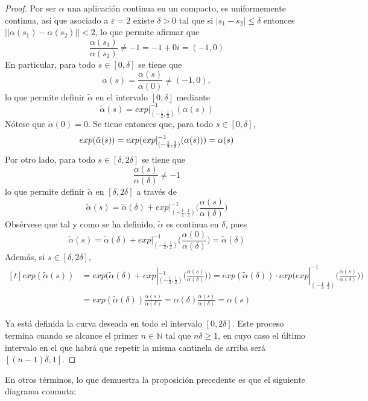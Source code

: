 \documentclass[11pt]{report}
\theoremstyle{definition}
\theoremstyle{definition}
\theoremstyle{remark}
\newcommand{\R}{\mathbb R}
\newcommand{\N}{\mathbb N}
\begin{document}
\begin{proof}
Por ser $\alpha$ una aplicación continua en un compacto, es uniformemente continua, así que asociado a $\varepsilon = 2$ existe $\delta > 0$ tal que si $|s_1-s_2| \leq \delta$ entonces $||\alpha(s_1)-\alpha(s_2)|| < 2$, lo que permite afirmar que
\[\frac{\alpha(s_1)}{\alpha(s_2)} \neq -1 = -1+0i = (-1,0)\]
En particular, para todo $s \in [0,\delta]$ se tiene que
\[\alpha(s) = \frac{\alpha(s)}{\alpha(0)} \neq (-1,0),\]
lo que permite definir $\tilde{\alpha}$ en el intervalo $[0,\delta]$ mediante
\[\tilde{\alpha}(s) = exp|_{(-\frac{1}{2},\frac{1}{2})}^{-1}(\alpha(s))\]
Nótese que $\tilde{\alpha}(0) = 0$. Se tiene entonces que, para todo $s \in [0,\delta]$,
\[exp(\tilde{\alpha}(s)) = exp(exp|_{(-\frac{1}{2},\frac{1}{2})}^{-1}(\alpha(s))) = \alpha(s)\textup{}\]
Por otro lado, para todo $s \in [\delta,2\delta]$ se tiene que
\[\frac{\alpha(s)}{\alpha(\delta)} \neq -1\]
lo que permite definir $\tilde{\alpha}$ en $[\delta,2\delta]$ a través de
\[\tilde{\alpha}(s) = \tilde{\alpha}(\delta)+exp|_{(-\frac{1}{2},\frac{1}{2})}^{-1}\biggl(\frac{\alpha(s)}{\alpha(\delta)}\biggr)\]
Obsérvese que tal y como se ha definido, $\tilde{\alpha}$ es continua en $\delta$, pues
\[\tilde{\alpha}(s) = \tilde{\alpha}(\delta)+exp|_{(-\frac{1}{2},\frac{1}{2})}^{-1}\biggl(\frac{\alpha(0)}{\alpha(\delta)}\biggr) = \tilde{\alpha}(\delta)\]
Además, si $s \in [\delta,2\delta]$,
\[
\begin{aligned}[t]
exp(\tilde{\alpha}(s)) &= exp\biggl(\tilde{\alpha}(\delta)+exp|_{(-\frac{1}{2},\frac{1}{2})}^{-1}\biggl(\frac{\alpha(s)}{\alpha(\delta)}\biggr)\biggr) = exp(\tilde{\alpha}(\delta)) \cdot exp\biggl(exp|_{(-\frac{1}{2},\frac{1}{2})}^{-1}\biggl(\frac{\alpha(s)} {\alpha(\delta)}\biggr)\biggr) \\
&= exp(\tilde{\alpha}(\delta))\frac{\alpha(s)}{\alpha(\delta)} = \alpha(\delta)\frac{\alpha(s)}{\alpha(\delta)} = \alpha(s)
\end{aligned}\]

Ya está definida la curva deseada en todo el intervalo $[0,2\delta]$. Este proceso termina cuando se alcance el primer $n \in \N$ tal que $n\delta \geq 1$, en cuyo caso el último intervalo en el que habrá que repetir la misma cantinela de arriba será $[(n-1)\delta,1]$.
\end{proof}

En otros términos, lo que demuestra la proposición precedente es que el siguiente diagrama conmuta:
\begin{center}
\end{center}
\end{document}
